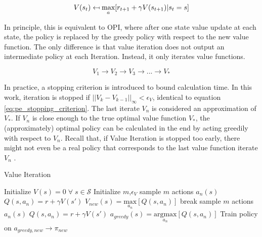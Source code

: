 \begin{equation}
V(s_t) \mathrel{\reflectbox{\ensuremath{\mapsto}}} 
\underset{a}{\text{max}}[r_{t+1}+\gamma V(s_{t+1})|s_t=s]
\label{eq:value_iteration_update}
\end{equation}

In principle, this is equivalent to OPI, where after one state value update at each state, the policy is replaced by the greedy policy with respect to the new value function. The only difference is that value iteration does not output an intermediate policy at each Iteration. Instead, it only iterates value functions. 

\begin{equation*}
V_1 \longrightarrow V_2 \longrightarrow V_3 \longrightarrow ... \longrightarrow  V_*
\label{eq:vi_scheme}
\end{equation*}

In practice, a stopping criterion is introduced to bound calculation time. In this work, iteration is stopped if $||V_{k}-V_{k-1}||_\infty<\epsilon_V$, identical to equation \ref{eq:pe_stopping_criterion}. The last iterate $V_n$ is considered an approximation of $V_*$. If $V_n$ is close enough to the true optimal value function $V_*$, the (approximately) optimal policy can be calculated in the end by acting greedily with respect to $V_n$. Recall that, if Value Iteration is stopped too early, there might not even be a real policy that corresponds to the last value function iterate $V_n$ \cite[lecture~3]{Silver2015}.

\begin{algorithm}
	\caption{Value Iteration}
	\begin{algorithmic}[0] %
			\State
			\State Initialize $V(s) = 0 \; \forall \; s \in \mathcal{S}$
			\State Initialize $m$,$\epsilon_V$
			\State
					\State sample $m$ actions $a_n(s)$
						\State $Q(s,a_n) = r + \gamma V(s')$
					\EndFor		
					\State $V_{new}(s)=\underset{a_n}{\text{max}}[Q(s,a_n)]$
				\EndFor
					\State break
				\EndIf
			\EndWhile
			\State 
					\State sample $m$ actions $a_n(s)$
						\State $Q(s,a_n) = r + \gamma V(s')$
					\EndFor
					\State $a_{greedy}(s)=\underset{a_n}{\text{argmax}}[Q(s,a_n)]$
				\EndFor
			\EndFunction
			\State
			\State Train policy on $a_{greedy,new} \rightarrow \pi_{new}$
		\EndFunction
	\end{algorithmic}
	\label{algo:vi}
\end{algorithm}

